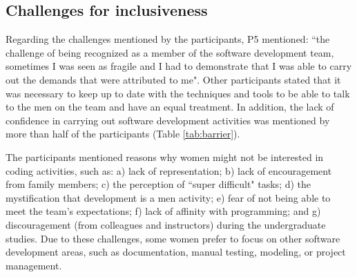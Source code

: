 \documentclass{IEEEcsmag}
\begin{document}


\subsection{Challenges for inclusiveness} 

Regarding the challenges mentioned by the participants, P5 mentioned: ``the challenge of being recognized as a member of the software development team, sometimes I was seen as fragile and I had to demonstrate that I was able to carry out the demands that were attributed to me". Other participants stated that it was necessary to keep up to date with the techniques and tools to be able to talk to the men on the team and have an equal treatment. In addition, the lack of confidence in carrying out software development activities was mentioned by more than half of the participants (Table \ref{tab:barrier}). 


The participants mentioned reasons why women might not be interested in coding activities, such as: a) lack of representation; b) lack of encouragement from family members; c) the perception of ``super difficult" tasks; d) the mystification that development is a men activity; e) fear of not being able to meet the team's expectations; f) lack of affinity with programming; and g) discouragement (from colleagues and instructors) during the undergraduate studies. Due to these challenges, some women prefer to focus on other software development areas, such as documentation, manual testing, modeling, or project management. 
\end{document}
